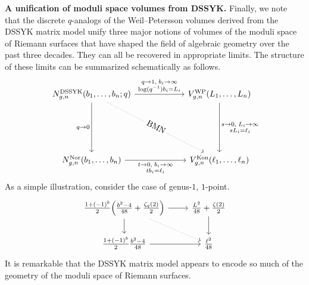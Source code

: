 \documentclass[a4paper,11pt,english]{article}
\theoremstyle{plain}
\theoremstyle{definition}
\theoremstyle{plain}
\begin{document}
\medskip

\textbf{A unification of moduli space volumes from DSSYK.} Finally, we note that the discrete $q$-analogs of the Weil--Petersson volumes derived from the DSSYK matrix model unify three major notions of volumes of the moduli space of Riemann surfaces that have shaped the field of algebraic geometry over the past three decades. They can all be recovered in appropriate limits. The structure of these limits can be summarized schematically as follows.
\begin{equation}
\begin{tikzcd}[column sep=6em, row sep=6em]
	{N^{\textup{DSSYK}}_{g,n}(b_1,\ldots,b_n;q)} & {V^{\textup{WP}}_{g,n}(L_1,\ldots,L_n)} \\
	{N^{\textup{Nor}}_{g,n}(b_1,\ldots,b_n)} & {V^{\textup{Kon}}_{g,n}(\ell_1,\ldots,\ell_n)}
	\arrow["{\substack{q \to 1, \; b_i \to \infty \\ \log(q^{-1})b_i = L_i}}", from=1-1, to=1-2]
	\arrow["{q \to 0}"', from=1-1, to=2-1]
	\arrow["\text{BMN}"{marking, allow upside down,description}, dotted, from=1-1, to=2-2]
	\arrow["{\substack{s \to 0, \; L_i \to \infty \\ s L_i = \ell_i}}", from=1-2, to=2-2]
	\arrow["{\substack{t \to 0, \; b_i \to \infty \\ tb_i = \ell_i}}"', from=2-1, to=2-2]
\end{tikzcd}
\end{equation}
As a simple illustration, consider the case of genus-$1$, $1$-point.
\begin{equation}
\begin{tikzcd}
	{\frac{1+(-1)^{b}}{2} \Bigl( \frac{b^2 - 4}{48} + \frac{\zeta_q(2)}{2} \Bigr)} & {\frac{L^2}{48} + \frac{\zeta(2)}{2}} \\
	{\frac{1+(-1)^{b}}{2} \frac{b^2 - 4}{48}} & {\frac{\ell^2}{48}}
	\arrow[from=1-1, to=1-2]
	\arrow[from=1-1, to=2-1]
	\arrow[dotted, from=1-1, to=2-2]
	\arrow[from=1-2, to=2-2]
	\arrow[from=2-1, to=2-2]
\end{tikzcd}
\end{equation}
It is remarkable that the DSSYK matrix model appears to encode so much of the geometry of the moduli space of Riemann surfaces.

\end{document}
